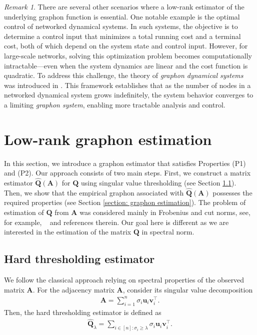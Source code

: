 \documentclass[11pt]{article}
\newcommand{\bA}{\bm{A}}
\newcommand{\bQ}{\bm{Q}}
\newcommand{\bQhat}{\widehat{\bm{Q}}}
\newcommand{\bu}{\bm{u}}
\newcommand{\bv}{\bm{v}}
\newcommand{\<}{\langle}
\renewcommand{\>}{\rangle}
\theoremstyle{plain}
\theoremstyle{definition}
\theoremstyle{remark}
\newtheorem{remark}{Remark}
\begin{document}
 \begin{remark}
There are several other scenarios where a low-rank estimator of the underlying graphon function is essential. One notable example is the optimal control of networked dynamical systems. In such systems, the objective is to determine a control input that minimizes a total running cost and a terminal cost, both of which depend on the system state and control input.  
 However, for large-scale networks, solving this optimization problem becomes computationally intractable—even when the system dynamics are linear and the cost function is quadratic. To address this challenge, the theory of \textit{graphon dynamical systems} was introduced in \citep{graphon_LQR_gao, low_rank_LQR_gao}. This framework establishes that as the number of nodes in a networked dynamical system grows indefinitely, the system behavior converges to a limiting \textit{graphon system}, enabling more tractable analysis and control.  
\end{remark}

\section{Low-rank graphon estimation}
\label{section: estimation}
 In this section, we introduce a graphon estimator that satisfies Properties (P1) and (P2).  Our approach consists of two main steps. First, we construct a matrix estimator \( \widehat{\mathbf{Q}}(\mathbf{A}) \) for \( \mathbf{Q} \) using singular value thresholding (see Section \ref{section: weight matrix estimation}). Then, we show that the empirical graphon associated with \( \widehat{\mathbf{Q}}(\mathbf{A}) \) possesses the required properties (see Section \ref{section: graphon estimation}).  
The problem of estimation of $\bQ$ from $\bA$ was considered mainly in Frobenius and cut norms, see, for example, ~\citep{chatterjee2012,gao2014rate,klopp2017,klopp2019,xu2017} and references therein. Our  goal here is different as we are interested in the estimation of the matrix $\bQ$ in spectral norm.


\subsection{Hard thresholding estimator}\label{section: weight matrix estimation}
We follow the classical approach relying on spectral properties of the observed matrix $\bA$. For the adjacency matrix $\bA$, consider its singular value decomposition
\begin{align*}
	\bA = \sum_{i = 1}^n \sigma_i \bu_i \bv_i^\top.
\end{align*}
Then,  the hard thresholding estimator is defined as
\begin{align}
\label{eq: HTE definition}
	\bQhat_\lambda = \sum_{i \in [n] : \sigma_i \ge \lambda} \sigma_i \bu_i \bv_i^\top.
\end{align}
\end{document}
